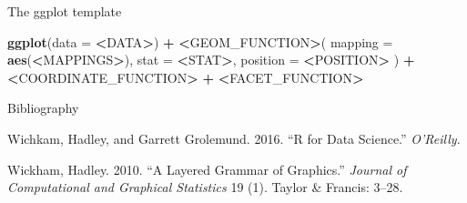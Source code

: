 \documentclass[ignorenonframetext,]{beamer}
\newenvironment{Shaded}{\begin{snugshade}}{\end{snugshade}}
\newcommand{\DataTypeTok}[1]{\textcolor[rgb]{0.13,0.29,0.53}{#1}}
\newcommand{\ErrorTok}[1]{\textcolor[rgb]{0.64,0.00,0.00}{\textbf{#1}}}
\newcommand{\KeywordTok}[1]{\textcolor[rgb]{0.13,0.29,0.53}{\textbf{#1}}}
\newcommand{\NormalTok}[1]{#1}
\newcommand{\OperatorTok}[1]{\textcolor[rgb]{0.81,0.36,0.00}{\textbf{#1}}}
\newcommand{\StringTok}[1]{\textcolor[rgb]{0.31,0.60,0.02}{#1}}
\begin{document}
\begin{frame}[fragile]{The ggplot template}
\protect\hypertarget{the-ggplot-template}{}

\begin{Shaded}
\begin{Highlighting}[]
\KeywordTok{ggplot}\NormalTok{(}\DataTypeTok{data =} \OperatorTok{<}\NormalTok{DATA}\OperatorTok{>}\NormalTok{) }\OperatorTok{+}\StringTok{ }
\StringTok{  }\ErrorTok{<}\NormalTok{GEOM_FUNCTION}\OperatorTok{>}\NormalTok{(}
     \DataTypeTok{mapping =} \KeywordTok{aes}\NormalTok{(}\OperatorTok{<}\NormalTok{MAPPINGS}\OperatorTok{>}\NormalTok{),}
     \DataTypeTok{stat =} \OperatorTok{<}\NormalTok{STAT}\OperatorTok{>}\NormalTok{, }
     \DataTypeTok{position =} \OperatorTok{<}\NormalTok{POSITION}\OperatorTok{>}
\StringTok{  }\NormalTok{) }\OperatorTok{+}
\StringTok{  }\ErrorTok{<}\NormalTok{COORDINATE_FUNCTION}\OperatorTok{>}\StringTok{ }\OperatorTok{+}
\StringTok{  }\ErrorTok{<}\NormalTok{FACET_FUNCTION}\OperatorTok{>}
\end{Highlighting}
\end{Shaded}

\end{frame}

\begin{frame}{Bibliography}
\protect\hypertarget{bibliography}{}

\hypertarget{refs}{}
\leavevmode\hypertarget{ref-wichkam2016r}{}%
Wichkam, Hadley, and Garrett Grolemund. 2016. ``R for Data Science.''
\emph{O'Reilly}.

\leavevmode\hypertarget{ref-wickham2010layered}{}%
Wickham, Hadley. 2010. ``A Layered Grammar of Graphics.'' \emph{Journal
of Computational and Graphical Statistics} 19 (1). Taylor \& Francis:
3--28.

\end{frame}
\end{document}

